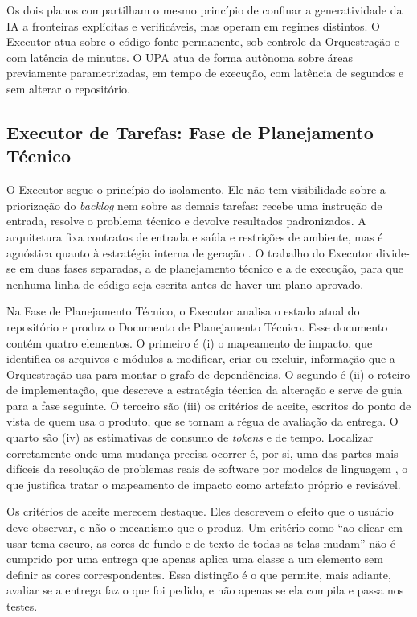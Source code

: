 Os dois planos compartilham o mesmo princípio de confinar a generatividade da IA a fronteiras explícitas e verificáveis, mas operam em regimes distintos. O Executor atua sobre o código-fonte permanente, sob controle da Orquestração e com latência de minutos. O UPA atua de forma autônoma sobre áreas previamente parametrizadas, em tempo de execução, com latência de segundos e sem alterar o repositório.

\subsection{Executor de Tarefas: Fase de Planejamento Técnico}\label{sec:4.5.1}

O Executor segue o princípio do isolamento. Ele não tem visibilidade sobre a priorização do \textit{backlog} nem sobre as demais tarefas: recebe uma instrução de entrada, resolve o problema técnico e devolve resultados padronizados. A arquitetura fixa contratos de entrada e saída e restrições de ambiente, mas é agnóstica quanto à estratégia interna de geração \cite{anthropic2026trends}. O trabalho do Executor divide-se em duas fases separadas, a de planejamento técnico e a de execução, para que nenhuma linha de código seja escrita antes de haver um plano aprovado.

Na Fase de Planejamento Técnico, o Executor analisa o estado atual do repositório e produz o Documento de Planejamento Técnico. Esse documento contém quatro elementos. O primeiro é (i) o mapeamento de impacto, que identifica os arquivos e módulos a modificar, criar ou excluir, informação que a Orquestração usa para montar o grafo de dependências. O segundo é (ii) o roteiro de implementação, que descreve a estratégia técnica da alteração e serve de guia para a fase seguinte. O terceiro são (iii) os critérios de aceite, escritos do ponto de vista de quem usa o produto, que se tornam a régua de avaliação da entrega. O quarto são (iv) as estimativas de consumo de \textit{tokens} e de tempo. Localizar corretamente onde uma mudança precisa ocorrer é, por si, uma das partes mais difíceis da resolução de problemas reais de software por modelos de linguagem \cite{jimenez2024swebench}, o que justifica tratar o mapeamento de impacto como artefato próprio e revisável.

Os critérios de aceite merecem destaque. Eles descrevem o efeito que o usuário deve observar, e não o mecanismo que o produz. Um critério como ``ao clicar em usar tema escuro, as cores de fundo e de texto de todas as telas mudam'' não é cumprido por uma entrega que apenas aplica uma classe a um elemento sem definir as cores correspondentes. Essa distinção é o que permite, mais adiante, avaliar se a entrega faz o que foi pedido, e não apenas se ela compila e passa nos testes.

